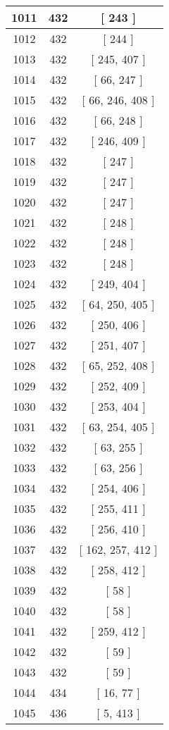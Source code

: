 \begin{center}
\begin{longtable}[H]{|| c c c ||}
\hline
1011 & 432 & [ 243 ] \\ 
\hline
1012 & 432 & [ 244 ] \\ 
\hline
1013 & 432 & [ 245, 407 ] \\ 
\hline
1014 & 432 & [ 66, 247 ] \\ 
\hline
1015 & 432 & [ 66, 246, 408 ] \\ 
\hline
1016 & 432 & [ 66, 248 ] \\ 
\hline
1017 & 432 & [ 246, 409 ] \\ 
\hline
1018 & 432 & [ 247 ] \\ 
\hline
1019 & 432 & [ 247 ] \\ 
\hline
1020 & 432 & [ 247 ] \\ 
\hline
1021 & 432 & [ 248 ] \\ 
\hline
1022 & 432 & [ 248 ] \\ 
\hline
1023 & 432 & [ 248 ] \\ 
\hline
1024 & 432 & [ 249, 404 ] \\ 
\hline
1025 & 432 & [ 64, 250, 405 ] \\ 
\hline
1026 & 432 & [ 250, 406 ] \\ 
\hline
1027 & 432 & [ 251, 407 ] \\ 
\hline
1028 & 432 & [ 65, 252, 408 ] \\ 
\hline
1029 & 432 & [ 252, 409 ] \\ 
\hline
1030 & 432 & [ 253, 404 ] \\ 
\hline
1031 & 432 & [ 63, 254, 405 ] \\ 
\hline
1032 & 432 & [ 63, 255 ] \\ 
\hline
1033 & 432 & [ 63, 256 ] \\ 
\hline
1034 & 432 & [ 254, 406 ] \\ 
\hline
1035 & 432 & [ 255, 411 ] \\ 
\hline
1036 & 432 & [ 256, 410 ] \\ 
\hline
1037 & 432 & [ 162, 257, 412 ] \\ 
\hline
1038 & 432 & [ 258, 412 ] \\ 
\hline
1039 & 432 & [ 58 ] \\ 
\hline
1040 & 432 & [ 58 ] \\ 
\hline
1041 & 432 & [ 259, 412 ] \\ 
\hline
1042 & 432 & [ 59 ] \\ 
\hline
1043 & 432 & [ 59 ] \\ 
\hline
1044 & 434 & [ 16, 77 ] \\ 
\hline
1045 & 436 & [ 5, 413 ] \\ 

\end{longtable}
\end{center}
